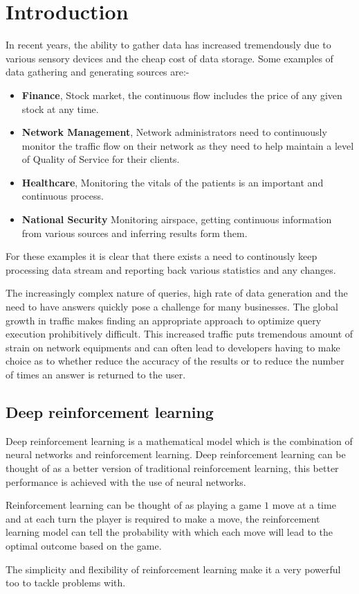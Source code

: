 \chapter{Introduction}
\label{chapter:Introduction}
\thispagestyle{myheadings}
In recent years, the ability to gather data has increased tremendously due to various sensory devices and the cheap cost of data storage. Some examples of data gathering and generating sources are:-
\begin{itemize}
    \item \textbf{Finance}, Stock market, the continuous flow includes the price of any given stock at any time. 
    \item \textbf{Network Management}, Network administrators need to continuously monitor the traffic flow on their network as they need to help maintain a level of Quality of Service for their clients.
    \item \textbf{Healthcare}, Monitoring the vitals of the patients is an important and continuous process. 
    \item \textbf{National Security} Monitoring airspace, getting continuous information from various sources and inferring results form them.
\end{itemize} 
For these examples it is clear that there exists a need to continously keep processing data stream and reporting back various statistics and any changes.
\par The increasingly complex nature of queries, high rate of data generation and the need to have answers quickly pose a challenge for many businesses. The global growth in traffic makes finding an appropriate approach to optimize query execution prohibitively difficult. This increased traffic puts tremendous amount of strain on network equipments and can often lead to developers having to make choice as to whether reduce the accuracy of the results or to reduce the number of times an answer is returned to the user.  

\section{Deep reinforcement learning}
Deep reinforcement learning is a mathematical model which is the combination of neural networks and reinforcement learning. Deep reinforcement learning can be thought of as a better version of traditional reinforcement learning, this better performance is achieved with the use of neural networks.
\par Reinforcement learning can be thought of as playing a game $1$ move at a time and at each turn the player is required to make a move, the reinforcement learning model can tell the probability with which each move will lead to the optimal outcome based on the game.
\par The simplicity and flexibility of reinforcement learning make it a very powerful too to tackle problems with. 
